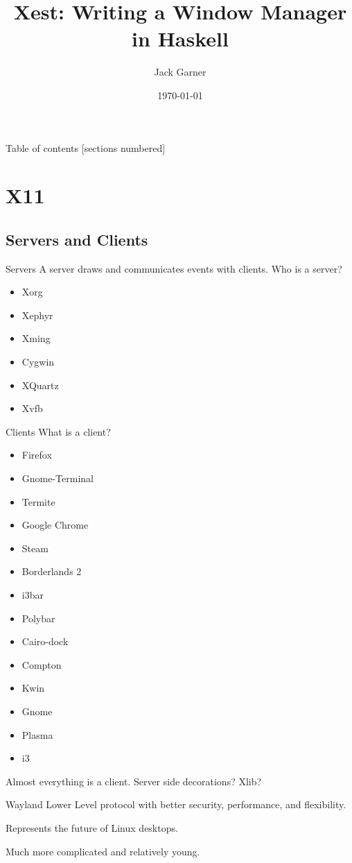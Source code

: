 \documentclass[10pt]{beamer}
\title{Xest: Writing a Window Manager in Haskell}
\subtitle{}
\date{\today}
\author{Jack Garner}
\institute{CSM LUG}
\begin{document}
\maketitle

\begin{frame}{Table of contents}
  [sections numbered]
  \tableofcontents[hideallsubsections]
\end{frame}

\section{X11}
\subsection{Servers and Clients}

\begin{frame}[fragile]{Servers}
  A server draws and communicates events with clients.
  \pause
  Who is a server?
  \begin{itemize}
    \item Xorg
    \item Xephyr
    \item Xming
    \item Cygwin
    \item XQuartz
    \item Xvfb
  \end{itemize}
  \pause
\end{frame}

\begin{frame}[fragile]{Clients}
  What is a client?
  \pause
  \begin{itemize}
    \item Firefox
    \item Gnome-Terminal
    \item Termite
    \item Google Chrome
    \item Steam
    \item Borderlands 2
  \end{itemize}
  \pause
  \begin{itemize}[<+->]
    \item i3bar
    \item Polybar
    \item Cairo-dock
    \item Compton
    \item Kwin
    \item Gnome
    \item Plasma
    \item i3
  \end{itemize}
  \pause
  Almost everything is a client.
  \pause
  Server side decorations?
  \pause
  Xlib?
\end{frame}
\begin{frame}[fragile]{Wayland}
  Lower Level protocol with better security, performance, and flexibility.

  Represents the future of Linux desktops.

  \pause
  Much more complicated and relatively young.
\end{frame}
\end{document}
